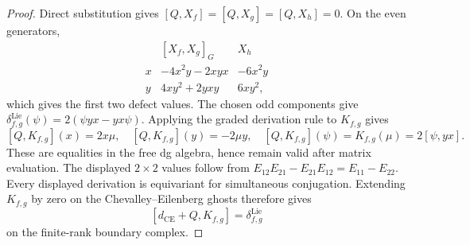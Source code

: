 \documentclass[11pt]{memoir}
\begin{document}
\begin{proof}
  Direct substitution gives \([Q,X_f]=[Q,X_g]=[Q,X_h]=0\).  On the
  even generators,
  \[
    \begin{array}{c|cc}
      &[X_f,X_g]_G&X_h\\ \hline
      x&-4x^2y-2xyx&-6x^2y\\
      y&4xy^2+2yxy&6xy^2,
    \end{array}
  \]
  which gives the first two defect values.  The chosen odd components
  give
  \(\delta^{\mathrm{Lie}}_{f,g}(\psi)=2(\psi yx-yx\psi)\).
  Applying the graded derivation rule to \(K_{f,g}\) gives
  \[
    [Q,K_{f,g}](x)=2x\mu,
    \quad [Q,K_{f,g}](y)=-2\mu y,
    \quad [Q,K_{f,g}](\psi)=K_{f,g}(\mu)=2[\psi,yx].
  \]
  These are equalities in the free dg algebra, hence remain valid after
  matrix evaluation.  The displayed \(2\times2\) values follow from
  \(E_{12}E_{21}-E_{21}E_{12}=E_{11}-E_{22}\).  Every displayed
  derivation is equivariant for simultaneous conjugation.  Extending
  \(K_{f,g}\) by zero on the Chevalley--Eilenberg ghosts therefore gives
  \[
    [d_{\mathrm{CE}}+Q,K_{f,g}]
      =\delta^{\mathrm{Lie}}_{f,g}
  \]
  on the finite-rank boundary complex.
\end{proof}
\end{document}
